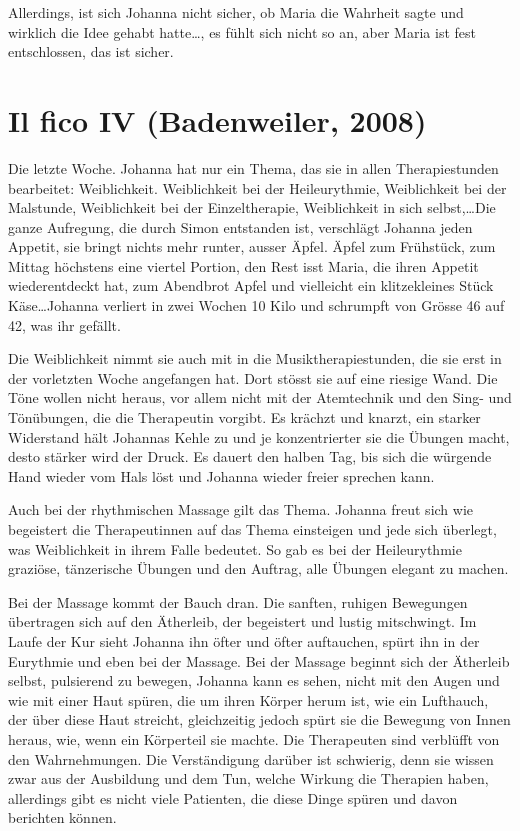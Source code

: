 \documentclass[10pt,titlepage,a5paper]{book}
\begin{document}
Allerdings, ist sich Johanna nicht sicher, ob Maria die Wahrheit sagte und wirklich die Idee gehabt hatte\dots , es fühlt sich nicht so an, aber Maria ist fest entschlossen, das ist sicher.



\section*{Il fico IV (Badenweiler, 2008)}



Die letzte Woche. Johanna hat nur ein Thema, das sie in allen Therapiestunden bearbeitet: Weiblichkeit. Weiblichkeit bei der Heileurythmie, Weiblichkeit bei der Malstunde, Weiblichkeit bei der Einzeltherapie, Weiblichkeit in sich selbst,\dots  Die ganze Aufregung, die durch Simon entstanden ist, verschlägt Johanna jeden Appetit, sie bringt nichts mehr runter, ausser Äpfel. Äpfel zum Frühstück, zum Mittag höchstens eine viertel Portion, den Rest isst Maria, die ihren Appetit wiederentdeckt hat, zum Abendbrot Apfel und vielleicht ein klitzekleines Stück Käse\dots  Johanna verliert in zwei Wochen 10 Kilo und schrumpft von Grösse 46 auf 42, was ihr gefällt.

Die Weiblichkeit nimmt sie auch mit in die Musiktherapiestunden, die sie erst in der vorletzten Woche angefangen hat. Dort stösst sie auf eine riesige Wand. Die Töne wollen nicht heraus, vor allem nicht mit der Atemtechnik und den Sing- und Tönübungen, die die Therapeutin vorgibt. Es krächzt und knarzt, ein starker Widerstand hält Johannas Kehle zu und je konzentrierter sie die Übungen macht, desto stärker wird der Druck. Es dauert den halben Tag, bis sich die würgende Hand wieder vom Hals löst und Johanna wieder freier sprechen kann.

Auch bei der rhythmischen Massage gilt das Thema. Johanna freut sich wie begeistert die Therapeutinnen auf das Thema einsteigen und jede sich überlegt, was Weiblichkeit in ihrem Falle bedeutet. So gab es bei der Heileurythmie graziöse, tänzerische Übungen und den Auftrag, alle Übungen elegant zu machen.

Bei der Massage kommt der Bauch dran. Die sanften, ruhigen Bewegungen übertragen sich auf den Ätherleib, der begeistert und lustig mitschwingt. Im Laufe der Kur sieht Johanna ihn öfter und öfter auftauchen, spürt ihn in der Eurythmie und eben bei der Massage. Bei der Massage beginnt sich der Ätherleib selbst, pulsierend zu bewegen, Johanna kann es sehen, nicht mit den Augen und wie mit einer Haut spüren, die um ihren Körper herum ist, wie ein Lufthauch, der über diese Haut streicht, gleichzeitig jedoch spürt sie die Bewegung von Innen heraus, wie, wenn ein Körperteil sie machte. Die Therapeuten sind verblüfft von den Wahrnehmungen. Die Verständigung darüber ist schwierig, denn sie wissen zwar aus der Ausbildung und dem Tun, welche Wirkung die Therapien haben, allerdings gibt es nicht viele Patienten, die diese Dinge spüren und davon berichten können.
\end{document}

